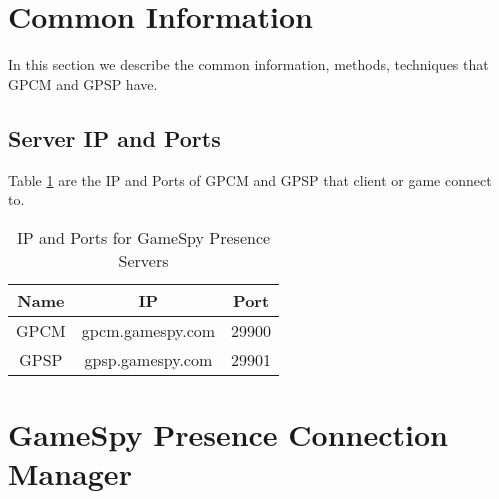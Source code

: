 \documentclass[oneside,titlepage,a4paper]{Definition/retrospy} %
\begin{document}
\section{Common Information}
In this section we describe the common information, methods, techniques that GPCM and GPSP have.
\subsection{Server IP and Ports}
Table \ref{IP and Ports for GameSpy Presence Servers} are the  IP and Ports of GPCM and GPSP that client or game connect to.
\begin{table}[H]
	\centering
	\begin{tabular}{|c|c|c|}
		\hline 
		\textbf{Name}&\textbf{IP}&\textbf{Port}\\ 
		\hline 
		GPCM&gpcm.gamespy.com&29900 \\ 
	 	\hline 
		GPSP&gpsp.gamespy.com&29901 \\
		\hline
	\end{tabular} 
\caption{IP and Ports for GameSpy Presence Servers}
\label{IP and Ports for GameSpy Presence Servers}

\end{table}

\section{GameSpy Presence Connection Manager}
\end{document}
